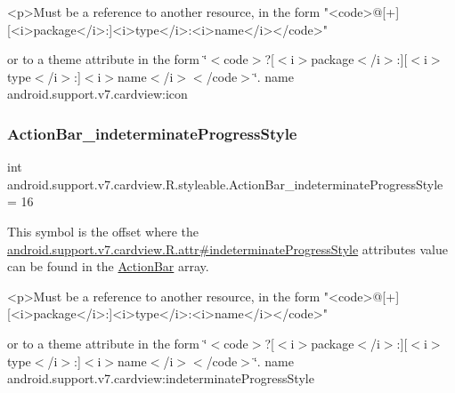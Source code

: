 \begin{DoxyVerb}      <p>Must be a reference to another resource, in the form "<code>@[+][<i>package</i>:]<i>type</i>:<i>name</i></code>"
\end{DoxyVerb}
 or to a theme attribute in the form \char`\"{}$<$code$>$?\mbox{[}$<$i$>$package$<$/i$>$\+:\mbox{]}\mbox{[}$<$i$>$type$<$/i$>$\+:\mbox{]}$<$i$>$name$<$/i$>$$<$/code$>$\char`\"{}.  name android.\+support.\+v7.\+cardview\+:icon \mbox{\label{classandroid_1_1support_1_1v7_1_1cardview_1_1R_1_1styleable_af7f0316f1a19f747887a7f5be05475c1}} 
\subsubsection{\texorpdfstring{Action\+Bar\+\_\+indeterminate\+Progress\+Style}{ActionBar\_indeterminateProgressStyle}}
{\footnotesize\ttfamily int android.\+support.\+v7.\+cardview.\+R.\+styleable.\+Action\+Bar\+\_\+indeterminate\+Progress\+Style = 16\hspace{0.3cm}{\ttfamily [static]}}

This symbol is the offset where the \hyperlink{classandroid_1_1support_1_1v7_1_1cardview_1_1R_1_1attr_a001418b7a674dd9d6eb9d1bf296281ea}{android.\+support.\+v7.\+cardview.\+R.\+attr\#indeterminate\+Progress\+Style} attribute\textquotesingle{}s value can be found in the \hyperlink{classandroid_1_1support_1_1v7_1_1cardview_1_1R_1_1styleable_a0cbf7f776e31f78bb0a2b558daf176f8}{Action\+Bar} array.

\begin{DoxyVerb}      <p>Must be a reference to another resource, in the form "<code>@[+][<i>package</i>:]<i>type</i>:<i>name</i></code>"
\end{DoxyVerb}
 or to a theme attribute in the form \char`\"{}$<$code$>$?\mbox{[}$<$i$>$package$<$/i$>$\+:\mbox{]}\mbox{[}$<$i$>$type$<$/i$>$\+:\mbox{]}$<$i$>$name$<$/i$>$$<$/code$>$\char`\"{}.  name android.\+support.\+v7.\+cardview\+:indeterminate\+Progress\+Style \mbox{\label{classandroid_1_1support_1_1v7_1_1cardview_1_1R_1_1styleable_a0300a227721a59ef431c82b92f5f7bf3}} 
